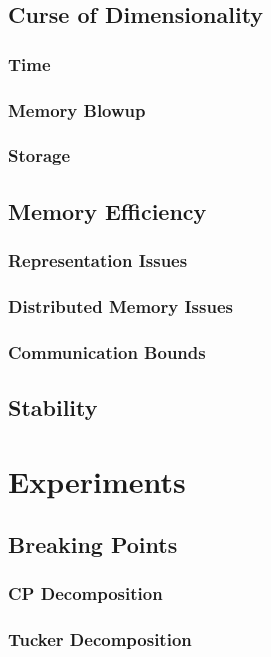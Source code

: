 \documentclass[10pt]{article}
\begin{document}
\subsection{Curse of Dimensionality}
\subsubsection{Time}
\subsubsection{Memory Blowup}
\subsubsection{Storage}
\subsection{Memory Efficiency}
\subsubsection{Representation Issues}
\subsubsection{Distributed Memory Issues}
\subsubsection{Communication Bounds}
\subsection{Stability}
\section{Experiments}
\subsection{Breaking Points}
\subsubsection{CP Decomposition}
\subsubsection{Tucker Decomposition}
\end{document}
